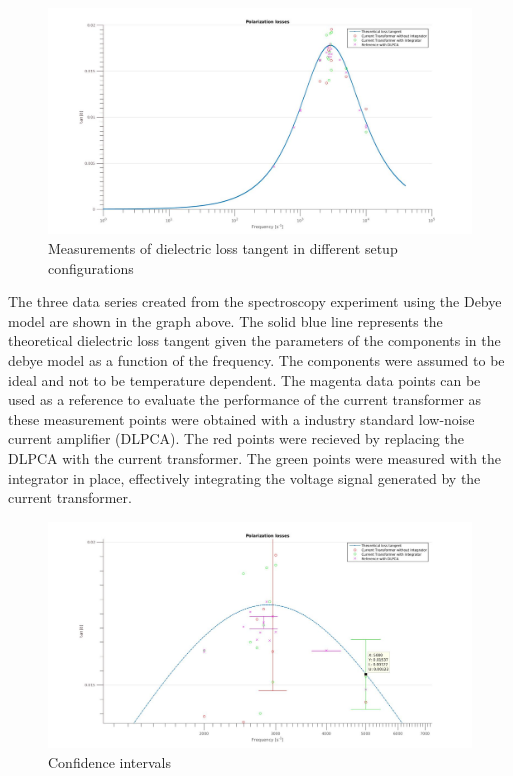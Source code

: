 \begin{figure}[htbp]
\centering
\includegraphics[scale=0.3]{figures/Results/Spectroscopy/spectroscopywithoutbars}
\caption[Kurze Abbildungsbeschreibung]{Measurements of dielectric loss tangent in different setup configurations}

\label{fig.spectroscopy}

\end{figure}
The three data series created from the spectroscopy experiment using the Debye model are shown in the graph above. The solid blue line represents the theoretical  dielectric loss tangent given the parameters of the components in the debye model
as a function of the frequency.
The components were assumed to be ideal and not to be temperature dependent.
The magenta data points can be used as a reference to evaluate the performance of the current transformer as these measurement points
were obtained with a industry standard low-noise current amplifier (DLPCA). 
The red points were recieved by replacing the DLPCA with the current transformer.
The green points were measured with the integrator in place, effectively integrating the voltage signal generated by the current transformer.
\newpage
\begin{figure}[htbp]
 \centering
 \includegraphics[scale=0.3]{figures/Results/Spectroscopy/errorbarsbettercolor}

\caption[Kurze Abbildungsbeschreibung]{Confidence intervals}
\label{fig.spectroscopy2}
\end{figure}

